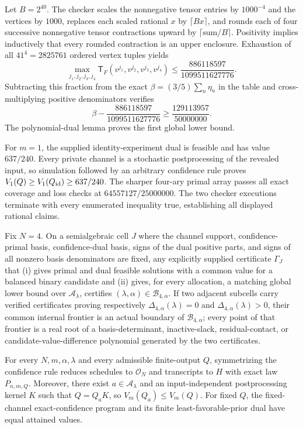 Let \(B=2^{40}\).  The checker scales the nonnegative tensor entries by \(1000^{-4}\) and the vertices by \(1000\), replaces each scaled rational \(x\) by \(\lceil Bx\rceil\), and rounds each of four successive nonnegative tensor contractions upward by \(\lceil\text{sum}/B\rceil\).  Positivity implies inductively that every rounded contraction is an upper enclosure.  Exhaustion of all \(41^4=2825761\) ordered vertex tuples yields
\[
 \max_{j_1,j_2,j_3,j_4}\mathsf T_F(v^{j_1},v^{j_2},v^{j_3},v^{j_4})
 \le\frac{886118597}{1099511627776}.
\]
Subtracting this fraction from the exact \(\beta=(3/5)\sum_n\eta_n\) in the table and cross-multiplying positive denominators verifies
\[
 \beta-\frac{886118597}{1099511627776}
 \ge\frac{129113957}{50000000}.
\]
The polynomial-dual lemma proves the first global lower bound.

For \(m=1\), the supplied identity-experiment dual is feasible and has value \(637/240\).  Every private channel is a stochastic postprocessing of the revealed input, so simulation followed by an arbitrary confidence rule proves \(V_1(Q)\ge V_1(Q_{\rm id})\ge637/240\).  The sharper four-ary primal array passes all exact coverage and loss checks at \(64557127/25000000\).  The two checker executions terminate with every enumerated inequality true, establishing all displayed rational claims.

Fix \(N=4\).  On a semialgebraic cell \(J\) where the channel support, confidence-primal basis, confidence-dual basis, signs of the dual positive parts, and signs of all nonzero basis denominators are fixed, any explicitly supplied certificate \(\Gamma_J\) that (i) gives primal and dual feasible solutions with a common value for a balanced binary candidate and (ii) gives, for every allocation, a matching global lower bound over \(\mathcal A_\lambda\), certifies \((\lambda,\alpha)\in\mathcal B_{4,\alpha}\).  If two adjacent subcells carry verified certificates proving respectively \(\Delta_{4,\alpha}(\lambda)=0\) and \(\Delta_{4,\alpha}(\lambda)>0\), their common internal frontier is an actual boundary of \(\mathcal B_{4,\alpha}\); every point of that frontier is a real root of a basis-determinant, inactive-slack, residual-contact, or candidate-value-difference polynomial generated by the two certificates.

For every \(N,m,\alpha,\lambda\) and every admissible finite-output \(Q\), symmetrizing the confidence rule reduces schedules to \(\mathcal O_N\) and transcripts to \(H\) with exact law \(P_{n,m,Q}\). Moreover, there exist \(a\in\mathcal A_\lambda\) and an input-independent postprocessing kernel \(K\) such that \(Q=Q_aK\), so \(V_m(Q_a)\le V_m(Q)\). For fixed \(Q\), the fixed-channel exact-confidence program and its finite least-favorable-prior dual have equal attained values.

